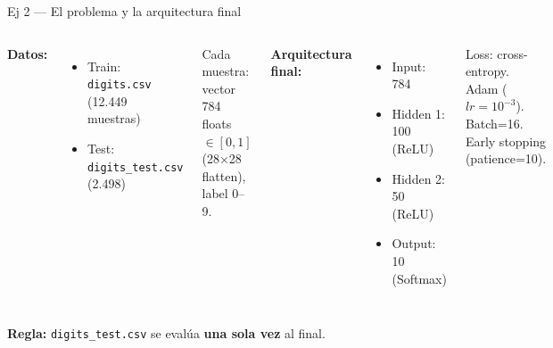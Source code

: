 \documentclass[11pt,aspectratio=169]{beamer}
\newcommand{\code}[1]{\texttt{\textcolor{accent}{#1}}}
\newcommand{\file}[1]{\texttt{\small #1}}
\begin{document}
\begin{frame}{Ej 2 — El problema y la arquitectura final}
\begin{columns}[T]
\textbf{Datos:}
\begin{itemize}
  \item Train: \file{digits.csv} (12.449 muestras)
  \item Test: \file{digits\_test.csv} (2.498)
\end{itemize}
Cada muestra: vector 784 floats $\in [0,1]$ (28$\times$28 flatten), label 0--9.

\textbf{Arquitectura final:}
\begin{itemize}
  \item Input: 784
  \item Hidden 1: 100 (ReLU)
  \item Hidden 2: 50 (ReLU)
  \item Output: 10 (Softmax)
\end{itemize}
Loss: cross-entropy. Adam ($lr=10^{-3}$). Batch=16. Early stopping (patience=10).
\end{columns}
\vspace{0.6em}

\begin{warning}
\textbf{Regla:} \code{digits\_test.csv} se evalúa \textbf{una sola vez} al final.
\end{warning}
\end{frame}
\end{document}
